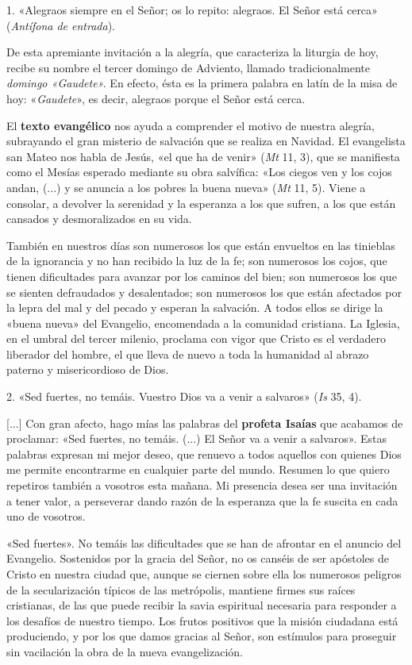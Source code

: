 \documentclass[]{article}
\begin{document}
1. «Alegraos siempre en el Señor; os lo repito: alegraos. El Señor está
cerca» (\emph{Antífona de entrada}).

De esta apremiante invitación a la alegría, que caracteriza la liturgia
de hoy, recibe su nombre el tercer domingo de Adviento, llamado
tradicionalmente \emph{domingo «Gaudete».} En efecto, ésta es la primera
palabra en latín de la misa de hoy: «\emph{Gaudete}», es decir, alegraos
porque el Señor está cerca.

El \textbf{texto evangélico} nos ayuda a comprender el motivo de nuestra
alegría, subrayando el gran misterio de salvación que se realiza en
Navidad. El evangelista san Mateo nos habla de Jesús, «el que ha de
venir» (\emph{Mt} 11, 3), que se manifiesta como el Mesías esperado
mediante su obra salvífica: «Los ciegos ven y los cojos andan, (...) y
se anuncia a los pobres la buena nueva» (\emph{Mt} 11, 5). Viene a
consolar, a devolver la serenidad y la esperanza a los que sufren, a los
que están cansados y desmoralizados en su vida.

También en nuestros días son numerosos los que están envueltos en las
tinieblas de la ignorancia y no han recibido la luz de la fe; son
numerosos los cojos, que tienen dificultades para avanzar por los
caminos del bien; son numerosos los que se sienten defraudados y
desalentados; son numerosos los que están afectados por la lepra del mal
y del pecado y esperan la salvación. A todos ellos se dirige la «buena
nueva» del Evangelio, encomendada a la comunidad cristiana. La Iglesia,
en el umbral del tercer milenio, proclama con vigor que Cristo es el
verdadero liberador del hombre, el que lleva de nuevo a toda la
humanidad al abrazo paterno y misericordioso de Dios.

2. «Sed fuertes, no temáis. Vuestro Dios va a venir a salvaros»
(\emph{Is} 35, 4).

{[}...{]} Con gran afecto, hago mías las palabras del \textbf{profeta
Isaías} que acabamos de proclamar: «Sed fuertes, no temáis. (...) El
Señor va a venir a salvaros». Estas palabras expresan mi mejor deseo,
que renuevo a todos aquellos con quienes Dios me permite encontrarme en
cualquier parte del mundo. Resumen lo que quiero repetiros también a
vosotros esta mañana. Mi presencia desea ser una invitación a tener
valor, a perseverar dando razón de la esperanza que la fe suscita en
cada uno de vosotros.

«Sed fuertes». No temáis las dificultades que se han de afrontar en el
anuncio del Evangelio. Sostenidos por la gracia del Señor, no os canséis
de ser apóstoles de Cristo en nuestra ciudad que, aunque se ciernen
sobre ella los numerosos peligros de la secularización típicos de las
metrópolis, mantiene firmes sus raíces cristianas, de las que puede
recibir la savia espiritual necesaria para responder a los desafíos de
nuestro tiempo. Los frutos positivos que la misión ciudadana está
produciendo, y por los que damos gracias al Señor, son estímulos para
proseguir sin vacilación la obra de la nueva evangelización.
\end{document}
